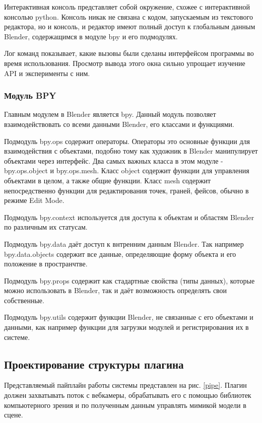 Интерактивная консоль представляет собой окружение, схожее с интерактивной консолью python. Консоль никак не связана с кодом, запускаемым из текстового редактора, но и консоль, и редактор имеют полный доступ к глобальным данным Blender, содержащимся в модуле bpy и его подмодулях.

Лог команд показывает, какие вызовы были сделаны интерфейсом программы во время использования. Просмотр вывода этого окна сильно упрощает изучение API и эксперименты с ним.

\subsubsection{Модуль BPY}

Главным модулем в Blender является bpy. Данный модуль позволяет взаимодействовать со всеми данными Blender, его классами и функциями. 

Подмодуль bpy.ops содержит операторы. Операторы это основные функции для взаимодействия с объектами, подобно тому как художник в Blender манипулирует объектами через интерфейс.
Два самых важных класса в этом модуле -  bpy.ops.object и bpy.ops.mesh. Класс object содержит функции для управления объектами в целом, а также общие функции. Класс mesh содержит непосредственно функции для редактирования точек, граней, фейсов, обычно в режиме Edit Mode.

Подмодуль bpy.context используется для доступа к объектам и областям Blender по различным их статусам.

Подмодуль bpy.data даёт доступ к внтренним данным Blender. Так например  bpy.data.objects содержит все данные, определяющие форму объекта и его положение в пространчтве.

Подмодуль bpy.props содержит как стадартные свойства (типы данных), которые можно использовать в Blender, так и даёт возможность определять свои собственные.

Подмодуль bpy.utils содержит функции Blender, не связанные с его объектами и данными, как например функции для загрузки модулей и регистрирования их в системе.

\subsection{Проектирование структуры плагина}

Представляемый пайплайн работы системы представлен на рис. \ref{pipe}. Плагин должен захватывать поток с вебкамеры, обрабатывать его с помощью библиотек компьютерного зрения и по полученным данным управлять мимикой модели в сцене.

